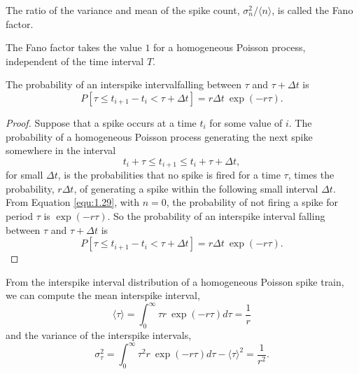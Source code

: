 \begin{defn}[\emph{Fano factor}]
    The ratio of the variance and mean of the spike count,
   $     \sigma^2_n/\langle n\rangle$, is called the Fano factor.            
\end{defn}

\begin{exm}
    The Fano factor takes the value $1$ for a homogeneous Poisson process, independent of the time interval $T$.
\end{exm}

\begin{lem}
    The probability of an interspike intervalfalling between $\tau$ and $\tau + \Delta t$ is 
    \begin{equation}
        P[\tau\leq t_{i+1}-t_{i}<\tau +\Delta t]=r\Delta t\ \exp(-r\tau).
        \label{equ:1.31}
    \end{equation}
    \begin{proof}
        Suppose that a spike occurs at a time $t_i$ for some value of $i$. The probability of a homogeneous Poisson process generating the next spike somewhere in the interval $$t_i+\tau \leq t_{i+1} \leq t_i + \tau +\Delta t,$$ for small $\Delta t$, is the probabilities that no spike is fired for a time $\tau$, times the probability, $r\Delta t$, of  generating a spike within the following small interval $\Delta t$. From Equation \ref{equ:1.29}, with $n=0$, the probability of not firing a spike for period $\tau$ is $\exp(-r\tau)$. So the probability of an interspike interval falling between $\tau$ and $\tau+\Delta t$ is $$  P[\tau\leq t_{i+1}-t_{i}<\tau +\Delta t]=r\Delta t\ \exp(-r\tau).$$
    \end{proof}
\end{lem}

\begin{thm}
    From the interspike interval distribution of a homogeneous Poisson spike train,  we can compute the mean interspike interval, 
    \begin{equation}
        \langle \tau \rangle =\int^{\infty}_{0}\tau r\ \exp(-r\tau)d\tau  = \frac{1}{r}
        \label{equ:1.32}         
    \end{equation}
    and the variance of the interspike intervals, 
    \begin{equation}
        \sigma^2_\tau =\int^{\infty}_{0}\tau^2 r\ \exp(-r\tau)d\tau - \langle \tau \rangle^2 = \frac{1}{r^2}.
        \label{equ:1.33}         
    \end{equation}
\end{thm}

